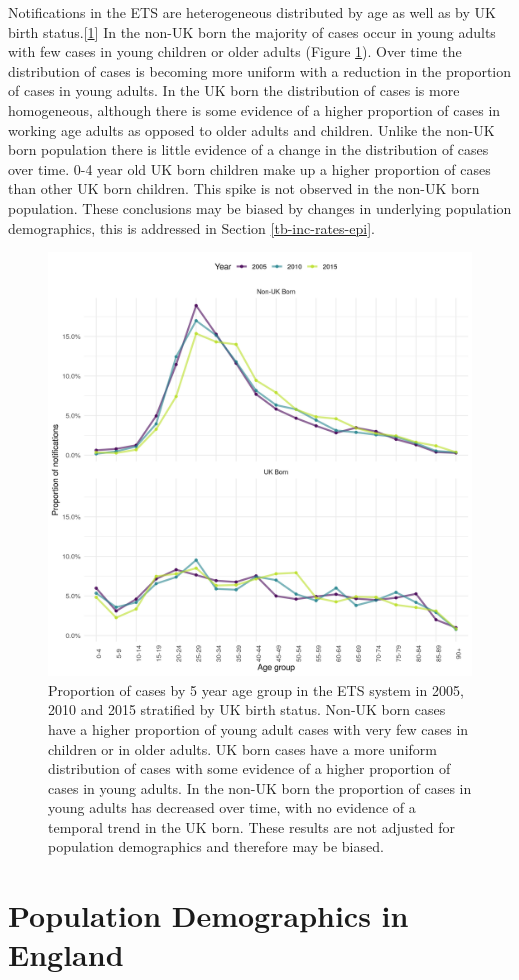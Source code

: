 \documentclass[11pt,twoside]{bristolthesis}
\begin{document}
  Notifications in the ETS are heterogeneous distributed by age as well as by UK birth status.{[}\protect\hyperlink{ref-PHE2017}{1}{]} In the non-UK born the majority of cases occur in young adults with few cases in young children or older adults (Figure \ref{fig:age-dist-cases-nots}). Over time the distribution of cases is becoming more uniform with a reduction in the proportion of cases in young adults. In the UK born the distribution of cases is more homogeneous, although there is some evidence of a higher proportion of cases in working age adults as opposed to older adults and children. Unlike the non-UK born population there is little evidence of a change in the distribution of cases over time. 0-4 year old UK born children make up a higher proportion of cases than other UK born children. This spike is not observed in the non-UK born population. These conclusions may be biased by changes in underlying population demographics, this is addressed in Section \ref{tb-inc-rates-epi}.
  \begin{figure}
  
  {\centering \includegraphics[width=0.8\linewidth,]{chapters/tb-epi-england/figures/plot-case-age-dist} 
  
  }
  
  \caption[Proportion of cases by 5 year age group in the ETS system in 2005, 2010 and 2015 stratified by UK birth status.]{Proportion of cases by 5 year age group in the ETS system in 2005, 2010 and 2015 stratified by UK birth status. Non-UK born cases have a higher proportion of young adult cases with very few cases in children or in older adults. UK born cases have a more uniform distribution of cases with some evidence of a higher proportion of cases in young adults. In the non-UK born the proportion of cases in young adults has decreased over time, with no evidence of a temporal trend in the UK born. These results are not adjusted for population demographics and therefore may be biased.}\label{fig:age-dist-cases-nots}
  \end{figure}
  \hypertarget{pop-dist-england}{%
  \section{Population Demographics in England}\label{pop-dist-england}}
  
\end{document}
